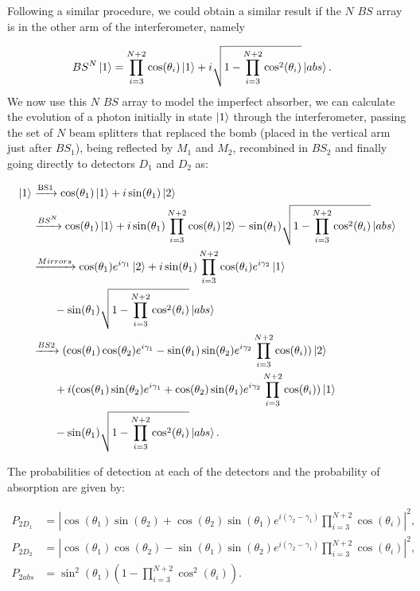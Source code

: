 \documentclass[12pt]{book}
\begin{document}
Following a similar procedure, we could obtain a similar result if the $N$ $BS$ array is in the other arm of the interferometer,  namely

\begin{align}
BS^{N}\ket{1}&=\prod_{i=3}^{N+2} \cos(\theta_{i})\ket{1}+i \sqrt{1-\prod_{i=3}^{N+2}\cos^2(\theta_{i})} \ket{abs}.
\end{align}
 We now use this $N$ $BS$ array to model the imperfect absorber, we can calculate the evolution of a photon initially in state $\ket{1}$ through the interferometer, passing the set of $N$ beam splitters that replaced the bomb (placed in the vertical arm just after $BS_1$), being reflected by $M_1$ and $M_2$, recombined in $BS_2$ and finally going directly to detectors $D_1$ and $D_2$ as: 


\begin{align*}
\ket{1}&\xrightarrow{\text{BS1}}\cos(\theta_{1})\ket{1}+i\sin(\theta_{1})\ket{2}\\ &\xrightarrow{{BS^{N}}}\cos(\theta_{1})\ket{1}+i\sin(\theta_{1})\prod_{i=3}^{N+2} \cos(\theta_{i})\ket{2}-\sin(\theta_{1})\sqrt{1-\prod_{i=3}^{N+2}\cos^2(\theta_{i})}\ket{abs} \\ & \xrightarrow{{Mirrors}}\cos(\theta_{1})  e^{i \gamma_{1}}\ket{2}+i\sin(\theta_{1})\prod_{i=3}^{N+2} \cos(\theta_{i}) e^{i \gamma_{2}}\ket{1}\\
& \qquad -\sin(\theta_{1})\sqrt{1-\prod_{i=3}^{N+2}\cos^2(\theta_{i})}\ket{abs} \\ & \xrightarrow{{BS2}}(\cos(\theta_{1})\cos(\theta_{2})e^{i \gamma_{1}}-\sin(\theta_{1})\sin(\theta_{2})e^{i \gamma_{2}}\prod_{i=3}^{N+2} \cos(\theta_{i}))\ket{2}\\ & \qquad + i(\cos(\theta_{1})\sin(\theta_{2})e^{i \gamma_{1}}+\cos(\theta_{2})\sin(\theta_{1})e^{i \gamma_{2}}\prod_{i=3}^{N+2} \cos(\theta_{i}))\ket{1}\\ & \qquad -\sin(\theta_{1})\sqrt{1-\prod_{i=3}^{N+2}\cos^2(\theta_{i})}\ket{abs}.
\end{align*}
 
The probabilities of detection at each of the detectors and the probability of absorption are given by:

\begin{align}
P_{2D_{1}}&=|\cos(\theta_{1})\sin(\theta_{2})+\cos(\theta_{2})\sin(\theta_{1})e^{i (\gamma_{2}-\gamma_{1})}\prod_{i=3}^{N+2} \cos(\theta_{i})|^2,\\
P_{2D_{2}}&=|\cos(\theta_{1})\cos(\theta_{2})-\sin(\theta_{1})\sin(\theta_{2})e^{i (\gamma_{2}-\gamma_{1})}\prod_{i=3}^{N+2} \cos(\theta_{i})|^2,\\
P_{2abs}&=\sin^2(\theta_{1})\left(1-\prod_{i=3}^{N+2}\cos^2(\theta_{i})\right).
\end{align}
\end{document}
